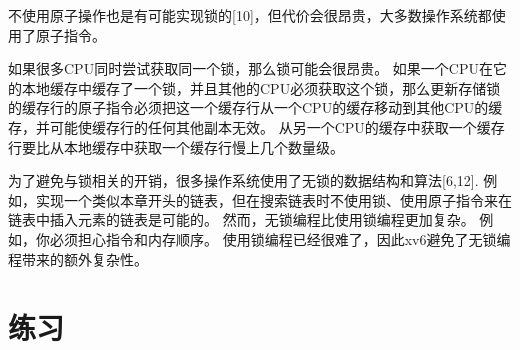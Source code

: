 不使用原子操作也是有可能实现锁的[10]，但代价会很昂贵，大多数操作系统都使用了原子指令。

如果很多CPU同时尝试获取同一个锁，那么锁可能会很昂贵。
如果一个CPU在它的本地缓存中缓存了一个锁，并且其他的CPU必须获取这个锁，那么更新存储锁的缓存行的原子指令必须把这一个缓存行从一个CPU的缓存移动到其他CPU的缓存，并可能使缓存行的任何其他副本无效。
从另一个CPU的缓存中获取一个缓存行要比从本地缓存中获取一个缓存行慢上几个数量级。

为了避免与锁相关的开销，很多操作系统使用了无锁的数据结构和算法[6,12].
例如，实现一个类似本章开头的链表，但在搜索链表时不使用锁、使用原子指令来在链表中插入元素的链表是可能的。
然而，无锁编程比使用锁编程更加复杂。
例如，你必须担心指令和内存顺序。
使用锁编程已经很难了，因此xv6避免了无锁编程带来的额外复杂性。

\section{练习}
